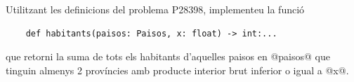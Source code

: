 
\Statement

Utilitzant les definicions del problema P28398,
implementeu la funció

\begin{lstlisting}
    def habitants(paisos: Paisos, x: float) -> int:...
\end{lstlisting}

que retorni la suma de tots els habitants 
d'aquelles paisos en @paisos@ que tinguin almenys 2 províncies amb producte
interior brut inferior o igual a @x@.


\ObservationNoMainTuples
